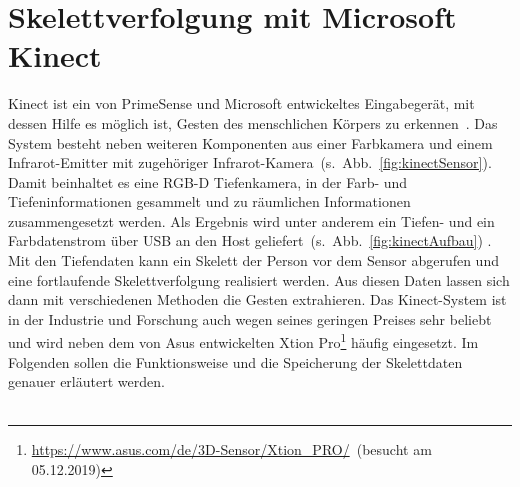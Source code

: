 \section{Skelettverfolgung mit Microsoft Kinect}\label{Tracking}
Kinect ist ein von PrimeSense und Microsoft entwickeltes Eingabegerät, mit dessen Hilfe es möglich ist, Gesten des menschlichen Körpers zu erkennen~\cite{hannaKinect1}. Das System besteht neben weiteren Komponenten aus einer Farbkamera und einem Infrarot-Emitter mit zugehöriger Infrarot-Kamera~(s.~Abb.~\ref{fig:kinectSensor}). Damit beinhaltet es eine RGB-D Tiefenkamera, in der Farb- und Tiefeninformationen gesammelt und zu räumlichen Informationen zusammengesetzt werden. Als Ergebnis wird unter anderem ein Tiefen- und ein Farbdatenstrom über USB an den Host geliefert~(s.~Abb.~\ref{fig:kinectAufbau}) \cite{hannaKinect1}. Mit den Tiefendaten kann ein Skelett der Person vor dem Sensor abgerufen und eine fortlaufende Skelettverfolgung realisiert werden. Aus diesen Daten lassen sich dann mit verschiedenen Methoden die Gesten extrahieren. Das Kinect-System ist in der Industrie und Forschung auch wegen seines geringen Preises sehr beliebt und wird neben dem von Asus entwickelten Xtion Pro\footnote{\url{https://www.asus.com/de/3D-Sensor/Xtion_PRO/}~(besucht am 05.12.2019)} häufig eingesetzt. Im Folgenden sollen die Funktionsweise und die Speicherung der Skelettdaten genauer erläutert werden.~\cite{cruzkinect}
\\ \\
